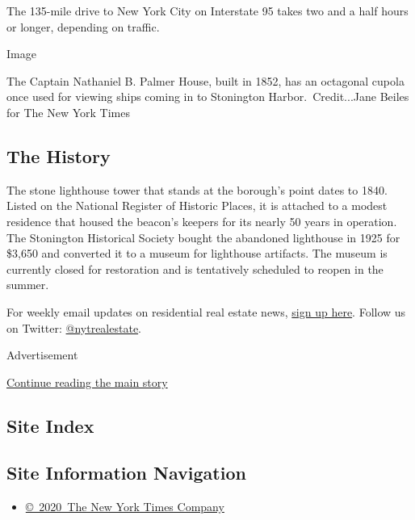 The 135-mile drive to New York City on Interstate 95 takes two and a
half hours or longer, depending on traffic.

Image

The Captain Nathaniel B. Palmer House, built in 1852, has an octagonal
cupola once used for viewing ships coming in to Stonington
Harbor.~Credit...Jane Beiles for The New York Times

\hypertarget{the-history}{%
\subsection{The History}\label{the-history}}

The stone lighthouse tower that stands at the borough's point dates to
1840. Listed on the National Register of Historic Places, it is attached
to a modest residence that housed the beacon's keepers for its nearly 50
years in operation. The Stonington Historical Society bought the
abandoned lighthouse in 1925 for \$3,650 and converted it to a museum
for lighthouse artifacts. The museum is currently closed for restoration
and is tentatively scheduled to reopen in the summer.

For weekly email updates on residential real estate news,
\href{http://www.nytimes3xbfgragh.onion/newsletters/realestate/}{sign up
here}. Follow us on Twitter:
\href{https://twitter.com/nytrealestate}{@nytrealestate}.

Advertisement

\protect\hyperlink{after-bottom}{Continue reading the main story}

\hypertarget{site-index}{%
\subsection{Site Index}\label{site-index}}

\hypertarget{site-information-navigation}{%
\subsection{Site Information
Navigation}\label{site-information-navigation}}

\begin{itemize}
\tightlist
\item
  \href{https://help.nytimes3xbfgragh.onion/hc/en-us/articles/115014792127-Copyright-notice}{©~2020~The
  New York Times Company}
\end{itemize}

